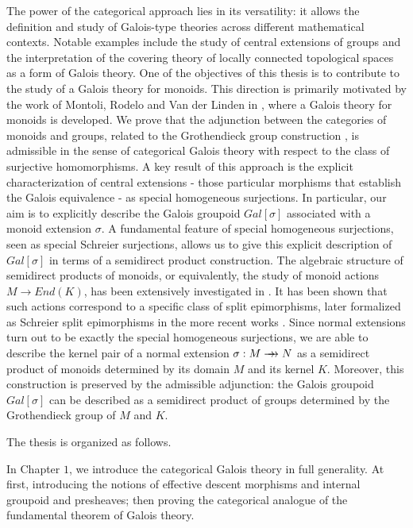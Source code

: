 \documentclass[11pt, a4paper]{article}
\theoremstyle{plain}
\theoremstyle{definition}
\newcommand{\rrightarrow}{\mathrel{\mathrlap{\rightarrow}\mkern1mu\rightarrow}}
\begin{document}
The power of the categorical approach lies in its versatility: it allows the definition and study of Galois-type theories across different mathematical contexts. Notable examples include the study of central extensions of groups and the interpretation of the covering theory of locally connected topological spaces as a form of Galois theory. One of the objectives of this thesis is to contribute to the study of a Galois theory for monoids. This direction is primarily motivated by the work of Montoli, Rodelo and Van der Linden in \cite{montoli2014galois}, where a Galois theory for monoids is developed. We prove that the adjunction between the categories of monoids and groups, related to the Grothendieck group construction \cite{malcev1937, malcev1939immersion, malcev1940immersion}, is admissible in the sense of categorical Galois theory with respect to the class of surjective homomorphisms. A key result of this approach is the explicit characterization of central extensions - those particular morphisms that establish the Galois equivalence - as special homogeneous surjections. In particular, our aim is to explicitly describe the Galois groupoid $Gal[\sigma]$ associated with a monoid extension $\sigma$. A fundamental feature of special homogeneous surjections, seen as special Schreier surjections, allows us to give this explicit description of $Gal[\sigma]$ in terms of a semidirect product construction. The algebraic structure of semidirect products of monoids, or equivalently, the study of monoid actions $M\to End(K)$, has been extensively investigated in \cite{patchkoria1998crossed}. It has been shown that such actions correspond to a specific class of split epimorphisms, later formalized as Schreier split epimorphisms in the more recent works \cite{bourn2014schreierSemirings, bourn2014schreier, martins2013semidirect}. Since normal extensions turn out to be exactly the special homogeneous surjections, we are able to describe the kernel pair of a normal extension $\sigma:M\rrightarrow N$ as a semidirect product of monoids determined by its domain $M$ and its kernel $K$. Moreover, this construction is preserved by the admissible adjunction: the Galois groupoid $Gal[\sigma]$ can be described as a semidirect product of groups determined by the Grothendieck group of $M$ and $K$.

\medskip

The thesis is organized as follows.

\smallskip

In Chapter $1$, we introduce the categorical Galois theory in full generality. At first, introducing the notions of effective descent morphisms and internal groupoid and presheaves; then proving the categorical analogue of the fundamental theorem of Galois theory. 
\end{document}

